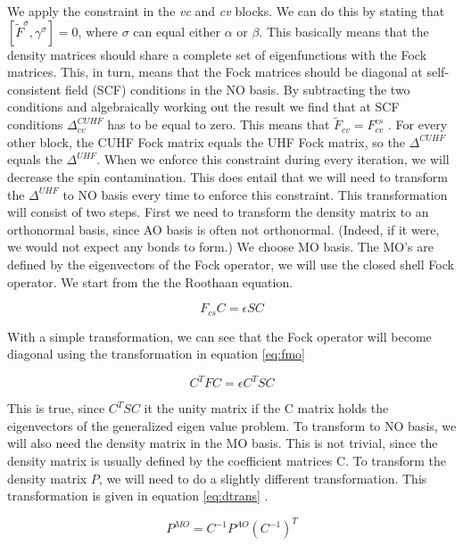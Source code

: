 We apply the constraint in the \textit{vc} and \textit{cv} blocks. We can do this by stating that $[\tilde{F}^\sigma, \gamma^\sigma] = 0$, where $\sigma$ can equal either $\alpha$
or $\beta$. This basically means that the density matrices should share a complete set of eigenfunctions with the Fock matrices. This, in turn, means that the Fock matrices should be
diagonal at self-consistent field (SCF) conditions in the NO basis. By subtracting the two conditions and algebraically working out the result we find that at SCF conditions
$\Delta^{CUHF}_{cv}$ has to be equal to zero. This means that $\tilde{F}_{cv} = F_{cv}^{cs}$ \cite{Scuseria2010}. For every other block, the CUHF Fock matrix equals the UHF Fock matrix,
so the $\Delta^{CUHF}$ equals the $\Delta^{UHF}$. When we enforce this constraint during every iteration, we will decrease the spin contamination. This does entail that we will need
to transform the $\Delta^{UHF}$ to NO basis every time to enforce this constraint. This transformation will consist of two steps. First we need to transform the density matrix to
an orthonormal basis, since AO basis is often not orthonormal. (Indeed, if it were, we would not expect any bonds to form.) We choose MO basis. The MO's are defined by the
eigenvectors of the Fock operator, we will use the closed shell Fock operator. We start from the the Roothaan equation.

\begin{equation}\label{eq:roothaan}
  F_{cs}C = \epsilon S C
\end{equation}

With a simple transformation, we can see that the Fock operator will become diagonal using the transformation in equation \eqref{eq:fmo}

\begin{equation}\label{eq:fmo}
  C^T F C = \epsilon C^T S C
\end{equation}

This is true, since $C^T S C$ it the unity matrix if the C matrix holds the eigenvectors of the generalized eigen value problem. To transform to NO basis, we will also need the
density matrix in the MO basis. This is not trivial, since the density matrix is usually defined by the coefficient matrices C. To transform the density matrix $P$, we will need
to do a slightly different transformation. This transformation is given in equation \eqref{eq:dtrans} \cite{Declercq2020}.

\begin{equation}\label{eq:dtrans}
  P^{MO} = C^{-1}P^{AO}(C^{-1})^T
\end{equation}

